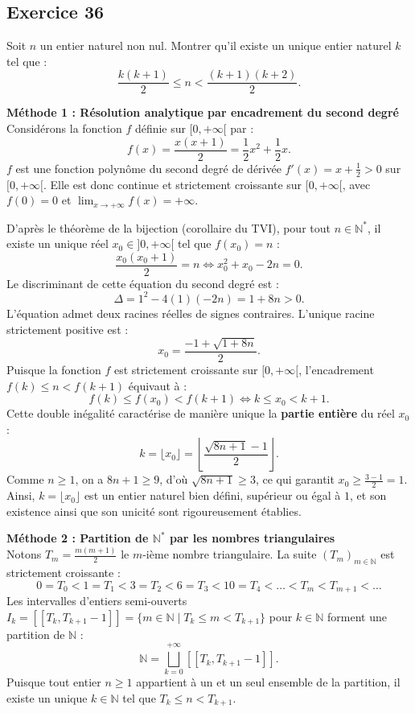 \documentclass[11pt,a4paper]{article}
\begin{document}
\subsection*{Exercice 36}
Soit $n$ un entier naturel non nul. Montrer qu'il existe un unique entier naturel $k$ tel que :
\[
\frac{k(k+1)}{2} \le n < \frac{(k+1)(k+2)}{2}.
\]

\begin{correctionbox}
\textbf{Méthode 1 : Résolution analytique par encadrement du second degré}\\
Considérons la fonction $f$ définie sur $[0, +\infty[$ par :
\[
f(x) = \frac{x(x+1)}{2} = \frac{1}{2}x^2 + \frac{1}{2}x.
\]
$f$ est une fonction polynôme du second degré de dérivée $f'(x) = x + \frac{1}{2} > 0$ sur $[0, +\infty[$.
Elle est donc continue et strictement croissante sur $[0, +\infty[$, avec $f(0) = 0$ et $\lim_{x \to +\infty} f(x) = +\infty$.

D'après le théorème de la bijection (corollaire du TVI), pour tout $n \in \mathbb{N}^*$, il existe un unique réel $x_0 \in ]0, +\infty[$ tel que $f(x_0) = n$ :
\[
\frac{x_0(x_0 + 1)}{2} = n \iff x_0^2 + x_0 - 2n = 0.
\]
Le discriminant de cette équation du second degré est :
\[
\Delta = 1^2 - 4(1)(-2n) = 1 + 8n > 0.
\]
L'équation admet deux racines réelles de signes contraires. L'unique racine strictement positive est :
\[
x_0 = \frac{-1 + \sqrt{1 + 8n}}{2}.
\]
Puisque la fonction $f$ est strictement croissante sur $[0, +\infty[$, l'encadrement $f(k) \le n < f(k+1)$ équivaut à :
\[
f(k) \le f(x_0) < f(k+1) \iff k \le x_0 < k+1.
\]
Cette double inégalité caractérise de manière unique la \textbf{partie entière} du réel $x_0$ :
\[
k = \lfloor x_0 \rfloor = \left\lfloor \frac{\sqrt{8n + 1} - 1}{2} \right\rfloor.
\]
Comme $n \ge 1$, on a $8n + 1 \ge 9$, d'où $\sqrt{8n + 1} \ge 3$, ce qui garantit $x_0 \ge \frac{3 - 1}{2} = 1$.
Ainsi, $k = \lfloor x_0 \rfloor$ est un entier naturel bien défini, supérieur ou égal à $1$, et son existence ainsi que son unicité sont rigoureusement établies.

\textbf{Méthode 2 : Partition de $\mathbb{N}^*$ par les nombres triangulaires}\\
Notons $T_m = \frac{m(m+1)}{2}$ le $m$-ième nombre triangulaire.
La suite $(T_m)_{m \in \mathbb{N}}$ est strictement croissante :
\[
0 = T_0 < 1 = T_1 < 3 = T_2 < 6 = T_3 < 10 = T_4 < \dots < T_m < T_{m+1} < \dots
\]
Les intervalles d'entiers semi-ouverts $I_k = [\![ T_k, T_{k+1} - 1 ]\!] = \{ m \in \mathbb{N} \mid T_k \le m < T_{k+1} \}$ pour $k \in \mathbb{N}$ forment une partition de $\mathbb{N}$ :
\[
\mathbb{N} = \bigsqcup_{k=0}^{+\infty} [\![ T_k, T_{k+1} - 1 ]\!].
\]
Puisque tout entier $n \ge 1$ appartient à un et un seul ensemble de la partition, il existe un unique $k \in \mathbb{N}$ tel que $T_k \le n < T_{k+1}$.
\end{correctionbox}
\end{document}

